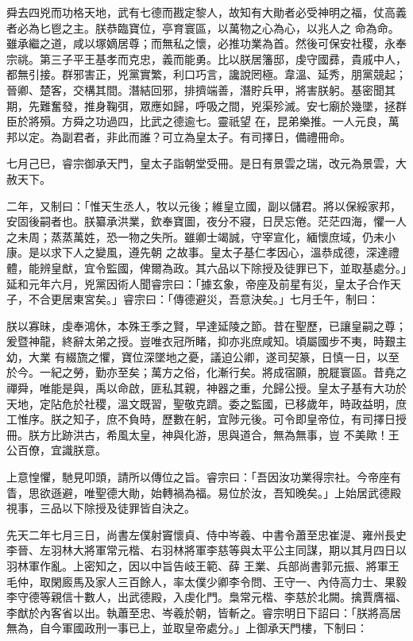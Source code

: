 \begin{pinyinscope}
 舜去四兇而功格天地，武有七德而戡定黎人，故知有大勛者必受神明之福，仗高義者必為匕鬯之主。朕恭臨寶位，亭育寰區，以萬物之心為心，以兆人之
 命為命。雖承繼之道，咸以塚嫡居尊；而無私之懷，必推功業為首。然後可保安社稷，永奉宗祧。第三子平王基孝而克忠，義而能勇。比以朕居籓邸，虔守國彞，貴戚中人，都無引接。群邪害正，兇黨實繁，利口巧言，讒說罔極。韋溫、延秀，朋黨競起；晉卿、楚客，交構其間。潛結回邪，排擠端善，潛貯兵甲，將害朕躬。基密聞其期，先難奮發，推身鞠弭，眾應如歸，呼吸之間，兇渠殄滅。安七廟於幾墜，拯群臣於將殞。方舜之功過四，比武之德逾七。靈祇望
 在，昆弟樂推。一人元良，萬邦以定。為副君者，非此而誰？可立為皇太子。有司擇日，備禮冊命。



 七月己巳，睿宗御承天門，皇太子詣朝堂受冊。是日有景雲之瑞，改元為景雲，大赦天下。



 二年，又制曰：「惟天生丞人，牧以元後；維皇立國，副以儲君。將以保綏家邦，安固後嗣者也。朕纂承洪業，欽奉寶圖，夜分不寢，日昃忘倦。茫茫四海，懼一人之未周；蒸蒸萬姓，恐一物之失所。雖卿士竭誠，守宰宣化，緬懷庶域，仍未小康。是以求下人之變風，遵先朝
 之故事。皇太子基仁孝因心，溫恭成德，深達禮體，能辨皇猷，宜令監國，俾爾為政。其六品以下除授及徒罪已下，並取基處分。」延和元年六月，兇黨因術人聞睿宗曰：「據玄象，帝座及前星有災，皇太子合作天子，不合更居東宮矣。」睿宗曰：「傳德避災，吾意決矣。」七月壬午，制曰：



 朕以寡昧，虔奉鴻休，本殊王季之賢，早達延陵之節。昔在聖歷，已讓皇嗣之尊；爰暨神龍，終辭太弟之授。豈唯衣冠所睹，抑亦兆庶咸知。頃屬國步不夷，時艱主幼，大業
 有綴旒之懼，寶位深墜地之憂，議迫公卿，遂司契篆，日慎一日，以至於今。一紀之勞，勤亦至矣；萬方之俗，化漸行矣。將成宿願，脫屣寰區。昔堯之禪舜，唯能是與，禹以命啟，匪私其親，神器之重，允歸公授。皇太子基有大功於天地，定阽危於社稷，溫文既習，聖敬克躋。委之監國，已移歲年，時政益明，庶工惟序。朕之知子，庶不負時，歷數在躬，宜陟元後。可令即皇帝位，有司擇日授冊。朕方比跡洪古，希風太皇，神與化游，思與道合，無為無事，豈
 不美歟！王公百僚，宜識朕意。



 上意惶懼，馳見叩頭，請所以傳位之旨。睿宗曰：「吾因汝功業得宗社。今帝座有眚，思欲遜避，唯聖德大勛，始轉禍為福。易位於汝，吾知晚矣。」上始居武德殿視事，三品以下除授及徒罪皆自決之。



 先天二年七月三日，尚書左僕射竇懷貞、侍中岑羲、中書令蕭至忠崔湜、雍州長史李晉、左羽林大將軍常元楷、右羽林將軍李慈等與太平公主同謀，期以其月四日以羽林軍作亂。上密知之，因以中旨告岐王範、薛
 王業、兵部尚書郭元振、將軍王毛仲，取閑廄馬及家人三百餘人，率太僕少卿李令問、王守一、內侍高力士、果毅李守德等親信十數人，出武德殿，入虔化門。梟常元楷、李慈於北闕。擒賈膺福、李猷於內客省以出。執蕭至忠、岑羲於朝，皆斬之。睿宗明日下詔曰：「朕將高居無為，自今軍國政刑一事已上，並取皇帝處分。」上御承天門樓，下制曰：




\end{pinyinscope}
